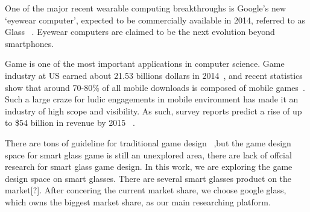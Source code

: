 
One of the major recent wearable computing breakthroughs is Google’s new ‘eyewear computer’, expected to be commercially available in 2014, referred to as Glass ~\cite{googleglass}. Eyewear computers are claimed to be the next evolution beyond smartphones.
 
Game is one of the most important applications in computer science. Game industry at US earned about 21.53 billions dollars in 2014~\cite{essentialfacts}, and recent statistics show that around 70-80\% of all mobile downloads is composed of mobile games~\cite{statistics,infographic}. Such a large craze for ludic engagements in mobile environment has made it an industry of high scope and visibility. As such, survey reports predict a rise of up to \$54 billion in revenue by 2015 ~\cite{statistics,infographic}.

There are tons of guideline for traditional game design ~\cite{videogame,mobilegame,bodygame,gameflow,argame,wearable},but the game design space for smart glass game is still an unexplored area, there are lack of offcial research for smart glass game design. In this work, we are exploring the game design space on smart glasses. There are several smart glasses product on the market[?]. After concering the current market share, we choose google glass, which owns the biggest market share, as our main researching platform.

